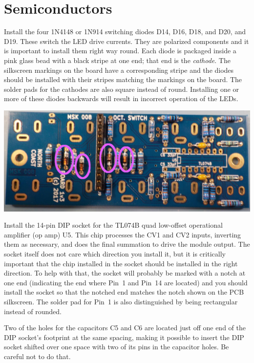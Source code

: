 \section{Semiconductors}

Install the four 1N4148 or 1N914 switching diodes D14, D16, D18, and D20,
and D19.  These switch the LED drive currents.
They are polarized components and it is important to
install them right way round.  Each diode is packaged inside a pink glass
bead with a black stripe at one end; that end is the \emph{cathode}.  The
silkscreen markings on the board have a corresponding stripe and the diodes
should be installed with their stripes matching the markings on the board. 
The solder pads for the cathodes are also square instead of round. 
Installing one or more of these diodes backwards will result in incorrect
operation of the LEDs.

\noindent\includegraphics[width=\linewidth]{diodes1.jpg}

Install the 14-pin DIP socket for the TL074B quad low-offset operational
amplifier (op amp) U5.  This chip processes the CV1 and CV2 inputs,
inverting them as necessary, and does the final summation to drive the
module output.  The socket itself does not care which direction you install
it, but it is critically important that the chip installed in the socket
should be installed in the right direction.  To help with that, the socket
will probably be marked with a notch at one end (indicating the end where
Pin~1 and Pin~14 are located) and you should install the socket so that the
notched end matches the notch shown on the PCB silkscreen.  The solder pad
for Pin~1 is also distinguished by being rectangular instead of rounded.

Two of the holes for the capacitors C5 and C6 are located just off one end
of the DIP socket's footprint at the same spacing, making it possible to
insert the DIP socket shifted over one space with two of its pins in the
capacitor holes.  Be careful not to do that.

